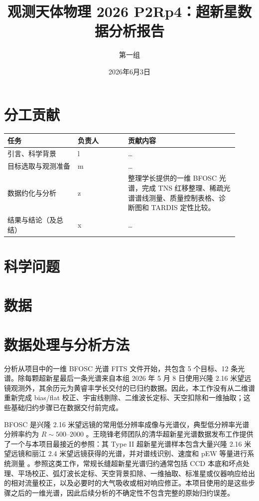 \documentclass[11pt]{article}
\title{观测天体物理 2026 P2Rp4：超新星数据分析报告}
\author{第一组}
\date{2026年6月3日}
\begin{document}
\maketitle

\section*{分工贡献}
\medskip
\noindent\begin{tabular}{p{0.28\linewidth}p{0.20\linewidth}p{0.44\linewidth}}
\toprule
任务 & 负责人 & 贡献内容 \\
\midrule
引言、科学背景 & l & \dots \\

目标选取与观测准备 & m & \dots \\

数据约化与分析 & z & 整理学长提供的一维 BFOSC 光谱，完成 TNS 红移整理、稀疏光谱谱线测量、质量控制表格、诊断图和 TARDIS 定性比较。 \\

结果与结论（及总结） & x & \dots \\

\bottomrule
\end{tabular}

\tableofcontents
\newpage

\section{科学问题}

\section{数据}

\section{数据处理与分析方法}
分析从项目中的一维 BFOSC 光谱 FITS 文件开始，共包含 5 个目标、12 条光谱。除每颗超新星最后一条光谱来自本组 2026 年 5 月 8 日使用兴隆 2.16 米望远镜观测外，其余历元为黄睿丰学长交付的已归约数据。因此，本工作没有从二维谱重新完成 bias/flat 校正、宇宙线剔除、二维波长定标、天空扣除和一维抽取；这些基础归约步骤已在数据交付前完成。

BFOSC 是兴隆 2.16 米望远镜的常用低分辨率成像与光谱仪，典型低分辨率光谱分辨率约为 $R\sim500$--$2000$ \cite{fanXinglong216m2016,zhaoBFOSCEfficiency2018}。王晓锋老师团队的清华超新星光谱数据发布工作提供了一个与本项目最接近的参照：其 Type II 超新星光谱样本包含大量兴隆 2.16 米望远镜和丽江 2.4 米望远镜获得的光谱，并对谱线识别、速度和 pEW 等量进行系统测量 \cite{linSpectralDataRelease2024}。参照这类工作，常规长缝超新星光谱归约通常包括 CCD 本底和坏点处理、平场校正、弧灯波长定标、天空背景扣除、一维抽取、标准星或仪器响应给出的相对流量校正，以及必要时的大气吸收或相对响应修正。本项目使用的是这些步骤之后的一维光谱，因此后续分析的不确定性不包含完整的原始归约误差。
\end{document}
